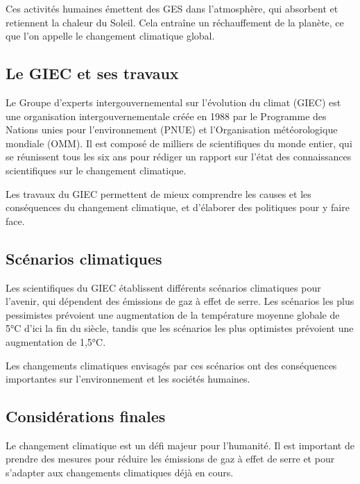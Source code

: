\documentclass{article}
\begin{document}
Ces activités humaines émettent des GES dans l'atmosphère, qui absorbent et retiennent la chaleur du Soleil. Cela entraîne un réchauffement de la planète, ce que l'on appelle le changement climatique global.

\subsection{Le GIEC et ses travaux}

Le Groupe d'experts intergouvernemental sur l'évolution du climat (GIEC) est une organisation intergouvernementale créée en 1988 par le Programme des Nations unies pour l'environnement (PNUE) et l'Organisation météorologique mondiale (OMM). Il est composé de milliers de scientifiques du monde entier, qui se réunissent tous les six ans pour rédiger un rapport sur l'état des connaissances scientifiques sur le changement climatique.

Les travaux du GIEC permettent de mieux comprendre les causes et les conséquences du changement climatique, et d'élaborer des politiques pour y faire face.

\subsection{Scénarios climatiques}

Les scientifiques du GIEC établissent différents scénarios climatiques pour l'avenir, qui dépendent des émissions de gaz à effet de serre. Les scénarios les plus pessimistes prévoient une augmentation de la température moyenne globale de 5°C d'ici la fin du siècle, tandis que les scénarios les plus optimistes prévoient une augmentation de 1,5°C.

Les changements climatiques envisagés par ces scénarios ont des conséquences importantes sur l'environnement et les sociétés humaines.

\subsection{Considérations finales}

Le changement climatique est un défi majeur pour l'humanité. Il est important de prendre des mesures pour réduire les émissions de gaz à effet de serre et pour s'adapter aux changements climatiques déjà en cours.
\end{document}
